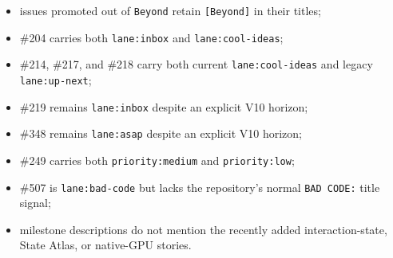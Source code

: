\begin{itemize}
\tightlist
\item
  issues promoted out of \texttt{B\allowbreak{}e\allowbreak{}y\allowbreak{}o\allowbreak{}n\allowbreak{}d} retain \texttt{[\allowbreak{}B\allowbreak{}e\allowbreak{}y\allowbreak{}o\allowbreak{}n\allowbreak{}d\allowbreak{}]} in their titles;
\item
  \#204 carries both \texttt{l\allowbreak{}a\allowbreak{}n\allowbreak{}e\allowbreak{}:\allowbreak{}i\allowbreak{}n\allowbreak{}b\allowbreak{}o\allowbreak{}x} and \texttt{l\allowbreak{}a\allowbreak{}n\allowbreak{}e\allowbreak{}:\allowbreak{}c\allowbreak{}o\allowbreak{}o\allowbreak{}l\allowbreak{}-\allowbreak{}i\allowbreak{}d\allowbreak{}e\allowbreak{}a\allowbreak{}s};
\item
  \#214, \#217, and \#218 carry both current \texttt{l\allowbreak{}a\allowbreak{}n\allowbreak{}e\allowbreak{}:\allowbreak{}c\allowbreak{}o\allowbreak{}o\allowbreak{}l\allowbreak{}-\allowbreak{}i\allowbreak{}d\allowbreak{}e\allowbreak{}a\allowbreak{}s} and legacy \texttt{l\allowbreak{}a\allowbreak{}n\allowbreak{}e\allowbreak{}:\allowbreak{}u\allowbreak{}p\allowbreak{}-\allowbreak{}n\allowbreak{}e\allowbreak{}x\allowbreak{}t};
\item
  \#219 remains \texttt{l\allowbreak{}a\allowbreak{}n\allowbreak{}e\allowbreak{}:\allowbreak{}i\allowbreak{}n\allowbreak{}b\allowbreak{}o\allowbreak{}x} despite an explicit V10 horizon;
\item
  \#348 remains \texttt{l\allowbreak{}a\allowbreak{}n\allowbreak{}e\allowbreak{}:\allowbreak{}a\allowbreak{}s\allowbreak{}a\allowbreak{}p} despite an explicit V10 horizon;
\item
  \#249 carries both \texttt{p\allowbreak{}r\allowbreak{}i\allowbreak{}o\allowbreak{}r\allowbreak{}i\allowbreak{}t\allowbreak{}y\allowbreak{}:\allowbreak{}m\allowbreak{}e\allowbreak{}d\allowbreak{}i\allowbreak{}u\allowbreak{}m} and \texttt{p\allowbreak{}r\allowbreak{}i\allowbreak{}o\allowbreak{}r\allowbreak{}i\allowbreak{}t\allowbreak{}y\allowbreak{}:\allowbreak{}l\allowbreak{}o\allowbreak{}w};
\item
  \#507 is \texttt{l\allowbreak{}a\allowbreak{}n\allowbreak{}e\allowbreak{}:\allowbreak{}b\allowbreak{}a\allowbreak{}d\allowbreak{}-\allowbreak{}c\allowbreak{}o\allowbreak{}d\allowbreak{}e} but lacks the repository's normal \texttt{B\allowbreak{}A\allowbreak{}D\allowbreak{} \allowbreak{}C\allowbreak{}O\allowbreak{}D\allowbreak{}E\allowbreak{}:} title signal;
\item
  milestone descriptions do not mention the recently added interaction-state, State Atlas, or native-GPU stories.
\end{itemize}


